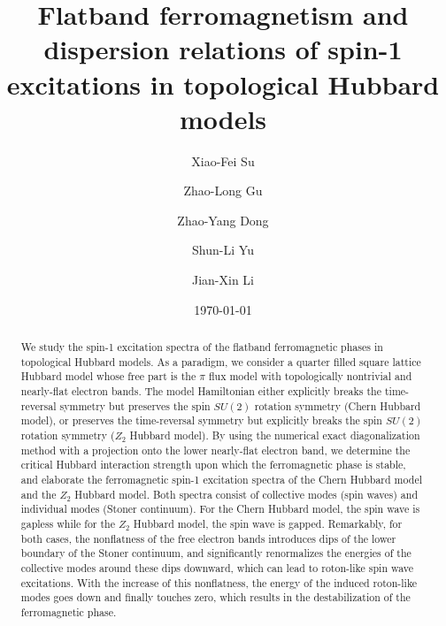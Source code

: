 \documentclass[amsmath,superscriptaddress,showpacs,aps,prb,twocolumn]{revtex4-1}
\begin{document}
\title{Flatband ferromagnetism and dispersion relations of spin-1 excitations in topological Hubbard models}
\author{Xiao-Fei Su}
\author{Zhao-Long Gu}
\author{Zhao-Yang Dong}
\author{Shun-Li Yu}
\author{Jian-Xin Li}
\date{\today}

\begin{abstract}
\par We study the spin-1 excitation spectra of the flatband ferromagnetic phases in topological Hubbard models. As a paradigm, we consider a quarter filled square lattice Hubbard model whose free part is the $\pi$ flux model with topologically nontrivial and nearly-flat electron bands. The model Hamiltonian either explicitly breaks the time-reversal symmetry but preserves the spin $SU(2)$ rotation symmetry (Chern Hubbard model), or preserves the time-reversal symmetry but explicitly breaks the spin $SU(2)$ rotation symmetry ($Z_2$ Hubbard model). By using the numerical exact diagonalization method with a projection onto the lower nearly-flat electron band, we determine the critical Hubbard interaction strength upon which the ferromagnetic phase is stable, and elaborate the ferromagnetic spin-1 excitation spectra of the Chern Hubbard model and the $Z_2$ Hubbard model. Both spectra consist of collective modes (spin waves) and individual modes (Stoner continuum). For the Chern Hubbard model, the spin wave is gapless while for the $Z_2$ Hubbard model, the spin wave is gapped. Remarkably, for both cases, the nonflatness of the free electron bands introduces dips of the lower boundary of the Stoner continuum, and significantly renormalizes the energies of the collective modes around these dips downward, which can lead to roton-like spin wave excitations. With the increase of this nonflatness, the energy of the induced roton-like modes goes down and finally touches zero, which results in the destabilization of the ferromagnetic phase.
\end{abstract}
\maketitle
\end{document}
